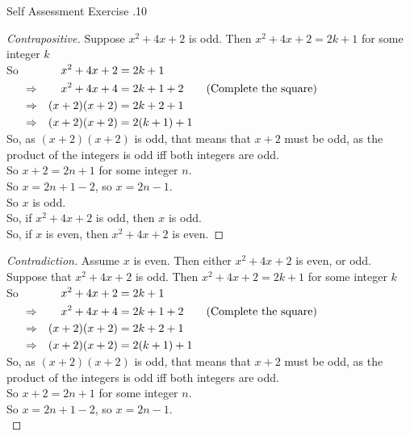 \documentclass[\main/notes.tex]{subfiles}
\begin{document}
\begin{exercise}{Self Assessment Exercise \thechapter.10}
\begin{enumerate}
\begin{enumerate}[label=(\alph*)]
\begin{proof}[Contrapositive]
										Suppose $x^{2} + 4x + 2$ is odd. Then $x^{2} + 4x + 2 = 2k + 1$ for some integer $k$\\
										So $\begin{alignedat}[t]{2}
											& & x^{2} + 4x + 2 &= 2k + 1\\
											& \Rightarrow \quad & x^{2} + 4x + 4 &= 2k + 1 + 2 \qquad \text{(Complete the square)}\\
											& \Rightarrow \quad & (x + 2)(x + 2) &= 2k + 2 + 1\\
											& \Rightarrow \quad & (x + 2)(x + 2) &= 2(k + 1) + 1
										\end{alignedat}$\\
										So, as $(x + 2)(x + 2)$ is odd, that means that $x + 2$ must be odd, as the product of the integers is odd iff both integers are odd.\\
										So $x + 2 = 2n + 1$ for some integer $n$.\\
										So $x = 2n + 1 - 2$, so $x = 2n - 1$.\\
										So $x$ is odd.\\
										So, if $x^{2} + 4x + 2$ is odd, then $x$ is odd.\\
										So, if $x$ is even, then $x^{2} + 4x + 2$ is even.
									\end{proof}
									\pagebreak
									\begin{proof}[Contradiction]
										Assume $x$ is even. Then either $x^{2} + 4x + 2$ is even, or odd.\\
										Suppose that $x^{2} + 4x + 2$ is odd. Then $x^{2} + 4x + 2 = 2k + 1$ for some integer $k$\\
										So $\begin{alignedat}[t]{2}
											& & x^{2} + 4x + 2 &= 2k + 1\\
											& \Rightarrow \quad & x^{2} + 4x + 4 &= 2k + 1 + 2 \qquad \text{(Complete the square)}\\
											& \Rightarrow \quad & (x + 2)(x + 2) &= 2k + 2 + 1\\
											& \Rightarrow \quad & (x + 2)(x + 2) &= 2(k + 1) + 1
										\end{alignedat}$\\
										So, as $(x + 2)(x + 2)$ is odd, that means that $x + 2$ must be odd, as the product of the integers is odd iff both integers are odd.\\
										So $x + 2 = 2n + 1$ for some integer $n$.\\
										So $x = 2n + 1 - 2$, so $x = 2n - 1$.\\

\end{proof}
\end{enumerate}
\end{enumerate}
\end{exercise}
\end{document}
